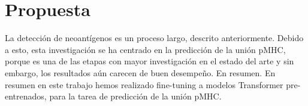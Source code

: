 \chapter{Propuesta}
\label{cap:propuesta}




La detección de neoantígenos es un proceso largo, descrito anteriormente. Debido a esto, esta investigación se ha centrado en la predicción de la unión pMHC, porque es una de las etapas con mayor investigación en el estado del arte y sin embargo, los resultados aún carecen de buen desempeño. En resumen. En resumen en este trabajo hemos realizado fine-tuning a modelos Transformer pre-entrenados, para la tarea de predicción de la unión pMHC.





